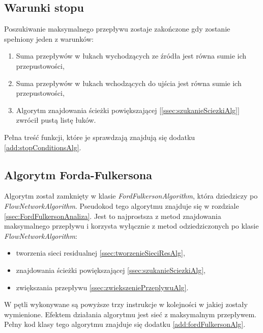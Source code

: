 \subsection{Warunki stopu}\label{ssec:warunkiStopu}
Poszukiwanie maksymalnego przepływu zostaje zakończone gdy zostanie spełniony jeden z warunków:
\begin{enumerate}
	\item Suma przepływów w łukach wychodzących ze źródła jest równa sumie ich przepustowości,
	\item Suma przepływów w łukach wchodzących do ujścia jest równa sumie ich przepustowości,
	\item Algorytm znajdowania ścieżki powiększającej [\ref{ssec:szukanieSciezkiAlg}] zwrócił pustą listę łuków.
\end{enumerate}
Pełna treść funkcji, które je sprawdzają znajdują się dodatku \ref{add:stopConditionsAlg}.

\subsection{Algorytm Forda-Fulkersona}\label{ssec:fordFulkersonWew}
Algorytm został zamknięty w klasie \emph{FordFulkersonAlgorithm}, która dziedziczy po \emph{FlowNetworkAlgorithm}. Pseudokod tego algorytmu znajduje się w rozdziale \ref{ssec:FordFulkersonAnaliza}. Jest to najprostsza z metod znajdowania maksymalnego przepływu i korzysta wyłącznie z metod odziedziczonych po klasie \emph{FlowNetworkAlgorithm}:
\begin{itemize}
	\item tworzenia sieci residualnej \ref{ssec:tworzenieSieciResAlg},
	\item znajdowania ścieżki powiększającej \ref{ssec:szukanieSciezkiAlg},
	\item zwiększania przepływu \ref{ssec:zwiekszeniePrzeplywuAlg}.
\end{itemize}
W pętli wykonywane są powyższe trzy instrukcje w kolejności w jakiej zostały wymienione. Efektem działania algorytmu jest sieć z maksymalnym przepływem. Pełny kod klasy tego algorytmu znajduje się dodatku \ref{add:fordFulkersonAlg}.
